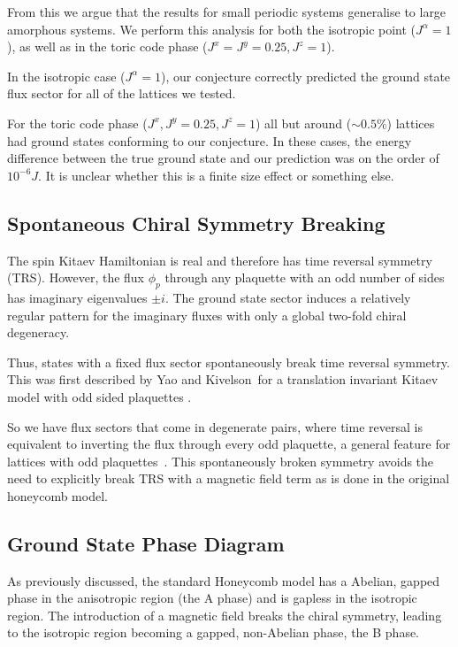 From this we argue that the results for small periodic systems generalise to large amorphous systems. We perform this analysis for both the isotropic point (\(J^\alpha = 1\)), as well as in the toric code phase (\(J^x = J^y = 0.25, J^z = 1\)).

In the isotropic case (\(J^\alpha = 1\)), our conjecture correctly predicted the ground state flux sector for all of the lattices we tested.

For the toric code phase (\(J^x, J^y = 0.25, J^z = 1\)) all but around (\(\sim 0.5 \%\)) lattices had ground states conforming to our conjecture. In these cases, the energy difference between the true ground state and our prediction was on the order of \(10^{-6} J\). It is unclear whether this is a finite size effect or something else.

\hypertarget{spontaneous-chiral-symmetry-breaking}{%
\subsection{Spontaneous Chiral Symmetry Breaking}\label{spontaneous-chiral-symmetry-breaking}}

The spin Kitaev Hamiltonian is real and therefore has time reversal symmetry (TRS). However, the flux \(\phi_p\) through any plaquette with an odd number of sides has imaginary eigenvalues \(\pm i\). The ground state sector induces a relatively regular pattern for the imaginary fluxes with only a global two-fold chiral degeneracy.

Thus, states with a fixed flux sector spontaneously break time reversal symmetry. This was first described by Yao and Kivelson~for a translation invariant Kitaev model with odd sided plaquettes \autocite{Yao2011}.

So we have flux sectors that come in degenerate pairs, where time reversal is equivalent to inverting the flux through every odd plaquette, a general feature for lattices with odd plaquettes~\autocite{yaoExactChiralSpin2007,Peri2020}. This spontaneously broken symmetry avoids the need to explicitly break TRS with a magnetic field term as is done in the original honeycomb model.

\hypertarget{ground-state-phase-diagram}{%
\subsection{Ground State Phase Diagram}\label{ground-state-phase-diagram}}

As previously discussed, the standard Honeycomb model has a Abelian, gapped phase in the anisotropic region (the A phase) and is gapless in the isotropic region. The introduction of a magnetic field breaks the chiral symmetry, leading to the isotropic region becoming a gapped, non-Abelian phase, the B phase.

